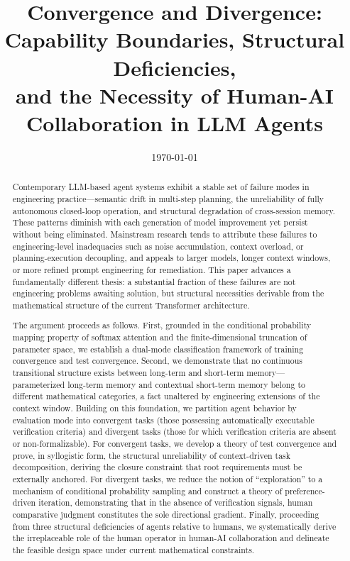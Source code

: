 \documentclass[11pt,a4paper]{article}
\title{{\bfseries Convergence and Divergence:\\Capability Boundaries, Structural Deficiencies,\\and the Necessity of Human-AI Collaboration in LLM Agents}}
\author{}
\date{\today}
\theoremstyle{definition}
\begin{document}
\maketitle

\begin{abstract}
\noindent
Contemporary LLM-based agent systems exhibit a stable set of failure modes in engineering practice---semantic drift in multi-step planning, the unreliability of fully autonomous closed-loop operation, and structural degradation of cross-session memory. These patterns diminish with each generation of model improvement yet persist without being eliminated. Mainstream research tends to attribute these failures to engineering-level inadequacies such as noise accumulation, context overload, or planning-execution decoupling, and appeals to larger models, longer context windows, or more refined prompt engineering for remediation. This paper advances a fundamentally different thesis: a substantial fraction of these failures are not engineering problems awaiting solution, but structural necessities derivable from the mathematical structure of the current Transformer architecture.

The argument proceeds as follows. First, grounded in the conditional probability mapping property of softmax attention and the finite-dimensional truncation of parameter space, we establish a dual-mode classification framework of training convergence and test convergence. Second, we demonstrate that no continuous transitional structure exists between long-term and short-term memory---parameterized long-term memory and contextual short-term memory belong to different mathematical categories, a fact unaltered by engineering extensions of the context window. Building on this foundation, we partition agent behavior by evaluation mode into convergent tasks (those possessing automatically executable verification criteria) and divergent tasks (those for which verification criteria are absent or non-formalizable). For convergent tasks, we develop a theory of test convergence and prove, in syllogistic form, the structural unreliability of context-driven task decomposition, deriving the closure constraint that root requirements must be externally anchored. For divergent tasks, we reduce the notion of ``exploration'' to a mechanism of conditional probability sampling and construct a theory of preference-driven iteration, demonstrating that in the absence of verification signals, human comparative judgment constitutes the sole directional gradient. Finally, proceeding from three structural deficiencies of agents relative to humans, we systematically derive the irreplaceable role of the human operator in human-AI collaboration and delineate the feasible design space under current mathematical constraints.


\end{abstract}
\end{document}
